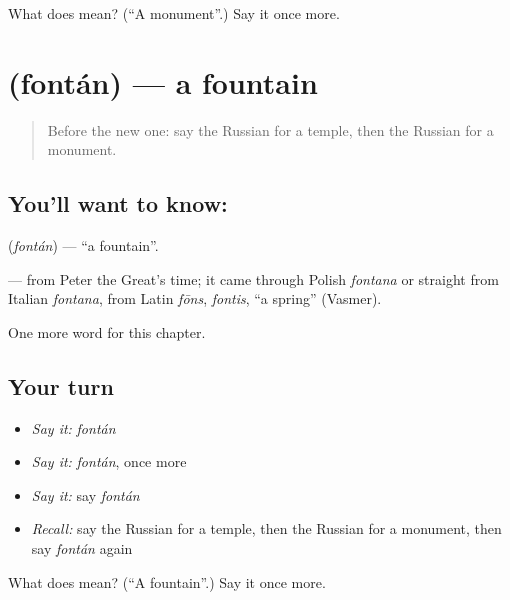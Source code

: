 \begin{tcolorbox}[breakable,colback=teal!4,colframe=teal!35!black,title={Before you move on}]
What does  mean? (\textquotedblleft{}A monument\textquotedblright{}.) Say it once more.
\end{tcolorbox}
\section[\texorpdfstring{\ru{фонтан} (fontán)}{фонтан (fontán)}]{ (fontán) — a fountain}

\label{lesson:RU-C153-fontan}



\begin{quote}
Before the new one: say the Russian for a temple, then the Russian for a monument.
\end{quote}

\subsection*{You'll want to know: }
\textbf{} (\emph{fontán}) — \textquotedblleft{}a fountain\textquotedblright{}.

\begin{cousinweb}
\textbf{} — from Peter the Great's time; it came through Polish \emph{fontana} or straight from Italian \emph{fontana}, from Latin \emph{fōns}, \emph{fontis}, \textquotedblleft{}a spring\textquotedblright{} (Vasmer).
\end{cousinweb}

\begin{grammarlens}[title={What you've built}]
One more word for this chapter.
\end{grammarlens}

\subsection*{Your turn}
\begin{itemize}
\raggedright
  \item \emph{Say it:} \emph{fontán}
  \item \emph{Say it:} \emph{fontán}, once more
  \item \emph{Say it:} say \emph{fontán}
  \item \emph{Recall:} say the Russian for a temple, then the Russian for a monument, then say \emph{fontán} again
\end{itemize}

\begin{tcolorbox}[breakable,colback=teal!4,colframe=teal!35!black,title={Before you move on}]
What does  mean? (\textquotedblleft{}A fountain\textquotedblright{}.) Say it once more.
\end{tcolorbox}
